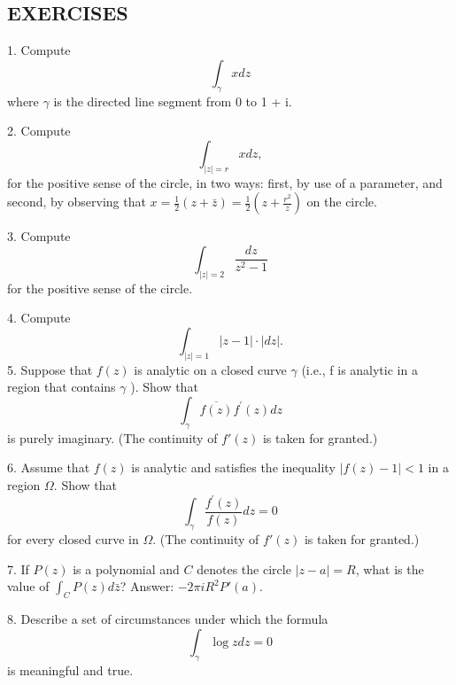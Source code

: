 \subsection*{EXERCISES}
1. Compute
\begin{equation*}
\int_ {\gamma} x d z
\end{equation*}
where $\gamma$ is the directed line segment from 0 to 1 + i.

2. Compute
\begin{equation*}
\int_ {| z | = r} x d z,
\end{equation*}
for the positive sense of the circle, in two ways: first, by use of a parameter, and second, by observing that $x = \frac{1}{2}(z + \bar{z}) = \frac{1}{2}\left(z + \frac{r^2}{z}\right)$ on the circle.

3. Compute
\begin{equation*}
\int_ {| z | = 2} \frac {d z}{z ^ {2} - 1}
\end{equation*}
for the positive sense of the circle.

4. Compute
\begin{equation*}
\int_ {| z | = 1} | z - 1 | \cdot | d z |.
\end{equation*}
5. Suppose that $f(z)$ is analytic on a closed curve $\gamma$ (i.e., f is analytic in a region that contains $\gamma$ ). Show that
\begin{equation*}
\int_ {\gamma} \overline {{{f (z)}}} f ^ {\prime} (z) d z
\end{equation*}
is purely imaginary. (The continuity of $f'(z)$ is taken for granted.)

6. Assume that $f(z)$ is analytic and satisfies the inequality $|f(z) - 1| < 1$ in a region $\Omega$. Show that
\begin{equation*}
\int_ {\gamma} \frac {f ^ {\prime} (z)}{f (z)} d z = 0
\end{equation*}
for every closed curve in $\Omega$. (The continuity of $f'(z)$ is taken for granted.)

7. If $P(z)$ is a polynomial and $C$ denotes the circle $|z - a| = R$, what is the value of $\int_{C} P(z) d\bar{z}$? Answer: $-2\pi iR^2P'(a)$.


8. Describe a set of circumstances under which the formula
\begin{equation*}
\int_ {\gamma} \log z d z = 0
\end{equation*}
is meaningful and true.


